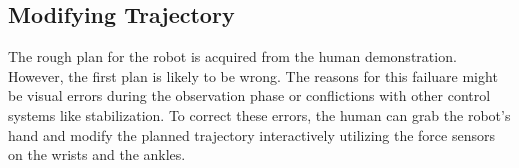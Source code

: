 \subsection{Modifying Trajectory}
The rough plan for the robot is acquired from the human demonstration. However, the first plan is likely to be wrong. The reasons for this failuare might be visual errors during the observation phase or conflictions with other control systems like stabilization. To correct these errors, the human can grab the robot's hand and modify the planned trajectory interactively utilizing the force sensors on the wrists and the ankles.


